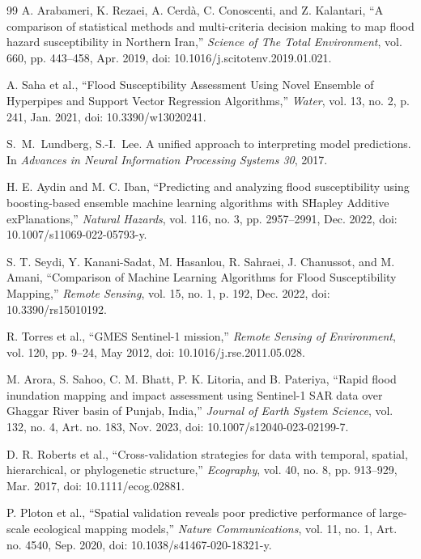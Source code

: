 \documentclass[10pt,twocolumn]{article}
\begin{document}
{\begin{thebibliography}{99}
A. Arabameri, K. Rezaei, A. Cerdà, C. Conoscenti, and Z. Kalantari, ``A comparison of statistical methods and multi-criteria decision making to map flood hazard susceptibility in Northern Iran,'' \emph{Science of The Total Environment}, vol. 660, pp. 443--458, Apr. 2019, doi: 10.1016/j.scitotenv.2019.01.021.

A. Saha et al., ``Flood Susceptibility Assessment Using Novel Ensemble of Hyperpipes and Support Vector Regression Algorithms,'' \emph{Water}, vol. 13, no. 2, p. 241, Jan. 2021, doi: 10.3390/w13020241.

S.~M.~Lundberg, S.-I.~Lee. A unified approach to interpreting model predictions. In \emph{Advances in Neural Information Processing Systems 30}, 2017.

H. E. Aydin and M. C. Iban, ``Predicting and analyzing flood susceptibility using boosting-based ensemble machine learning algorithms with SHapley Additive exPlanations,'' \emph{Natural Hazards}, vol. 116, no. 3, pp. 2957--2991, Dec. 2022, doi: 10.1007/s11069-022-05793-y.

S. T. Seydi, Y. Kanani-Sadat, M. Hasanlou, R. Sahraei, J. Chanussot, and M. Amani, ``Comparison of Machine Learning Algorithms for Flood Susceptibility Mapping,'' \emph{Remote Sensing}, vol. 15, no. 1, p. 192, Dec. 2022, doi: 10.3390/rs15010192.

R. Torres et al., ``GMES Sentinel-1 mission,'' \emph{Remote Sensing of Environment}, vol. 120, pp. 9--24, May 2012, doi: 10.1016/j.rse.2011.05.028.

M. Arora, S. Sahoo, C. M. Bhatt, P. K. Litoria, and B. Pateriya, ``Rapid flood inundation mapping and impact assessment using Sentinel-1 SAR data over Ghaggar River basin of Punjab, India,'' \emph{Journal of Earth System Science}, vol. 132, no. 4, Art. no. 183, Nov. 2023, doi: 10.1007/s12040-023-02199-7.

D. R. Roberts et al., ``Cross-validation strategies for data with temporal, spatial, hierarchical, or phylogenetic structure,'' \emph{Ecography}, vol. 40, no. 8, pp. 913--929, Mar. 2017, doi: 10.1111/ecog.02881.

P. Ploton et al., ``Spatial validation reveals poor predictive performance of large-scale ecological mapping models,'' \emph{Nature Communications}, vol. 11, no. 1, Art. no. 4540, Sep. 2020, doi: 10.1038/s41467-020-18321-y.


\end{thebibliography}}
\end{document}
